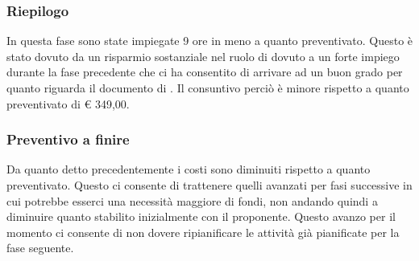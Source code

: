 		\subsubsection{Riepilogo} %
		In questa fase sono state impiegate 9 ore in meno a quanto preventivato. \newline
		Questo è stato dovuto da un risparmio sostanziale nel ruolo di \roleAnalyst{} dovuto a un forte impiego durante la fase precedente che ci ha consentito di arrivare ad un buon grado per quanto riguarda il documento di \docNameVersionAdR. \newline
		Il consuntivo perciò è minore rispetto a quanto preventivato di \euro{} 349,00.


		\subsubsection{Preventivo a finire} %
		Da quanto detto precedentemente i costi sono diminuiti rispetto a quanto preventivato. Questo ci consente di trattenere quelli avanzati per fasi successive in cui potrebbe esserci una necessità maggiore di fondi, non andando quindi a diminuire quanto stabilito inizialmente con il proponente. \newline
		Questo avanzo per il momento ci consente di non dovere ripianificare le attività già pianificate per la fase seguente.



